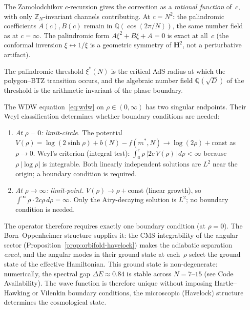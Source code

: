 \begin{remark}
\label{rmk:field-preservation}
The Zamolodchikov $c$-recursion gives the correction as a
\emph{rational function} of~$c$, with only
$\mathbb{Z}_N$-invariant channels contributing.
At $c = N^2$: the palindromic coefficients $A(c), B(c)$ remain in
$\mathbb{Q}(\cos(2\pi/N))$, the same number field as at $c = \infty$.
The palindromic form $A\xi^2 + B\xi + A = 0$ is exact at all~$c$
(the conformal inversion $\xi \leftrightarrow 1/\xi$ is a geometric
symmetry of $\mathbf{H}^2$, not a perturbative artifact).
\end{remark}

The palindromic threshold $\xi^*(N)$ is the critical AdS
radius at which the polygon--BTZ transition occurs, and
the algebraic number field $\mathbb{Q}(\sqrt{D})$ of the
threshold is the arithmetic invariant of the phase boundary.

\begin{remark}
\label{rmk:wdw-uniqueness}
The WDW equation~\eqref{eq:wdw} on $\rho \in (0,\infty)$ has two
singular endpoints.  Their Weyl classification determines whether
boundary conditions are needed:
\begin{enumerate}
\item \emph{At $\rho = 0$: limit-circle.}
  The potential $V(\rho) = \log(2\sinh\rho) + b(N) - f(m^*,N) \to
  \log(2\rho) + \mathrm{const}$ as $\rho \to 0$.
  Weyl's criterion (integral test): $\int_0^\varepsilon \rho\,|2c\,V(\rho)|\,d\rho
  < \infty$ because $\rho\,|\!\log\rho|$ is integrable.
  Both linearly independent solutions are $L^2$ near the origin;
  a boundary condition is required.
\item \emph{At $\rho \to \infty$: limit-point.}
  $V(\rho) \to \rho + \mathrm{const}$ (linear growth), so
  $\int^\infty \rho\cdot 2c\rho\,d\rho = \infty$.
  Only the Airy-decaying solution is $L^2$;
  no boundary condition is needed.
\end{enumerate}
The operator therefore requires exactly one boundary condition
(at $\rho = 0$).  The Born--Oppenheimer structure supplies it:
the CMS integrability of the angular sector
(Proposition~\ref{prop:orbifold-havelock}) makes the adiabatic
separation \emph{exact}, and the angular modes in their ground
state at each~$\rho$ select the ground state of the effective
Hamiltonian.  This ground state is non-degenerate: numerically,
the spectral gap $\Delta E \approx 0.84$ is stable across
$N = 7$--$15$ (see Code Availability).
The wave function is therefore unique without imposing
Hartle--Hawking or Vilenkin boundary conditions, the
microscopic (Havelock) structure determines the
cosmological state.
\end{remark}

